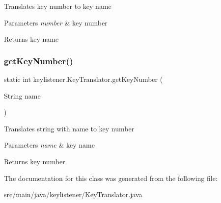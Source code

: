Translates key number to key name 
\begin{DoxyParams}{Parameters}
{\em number} & key number \\
\hline
\end{DoxyParams}
\begin{DoxyReturn}{Returns}
key name 
\end{DoxyReturn}
\mbox{\label{classkeylistener_1_1_key_translator_abd2332b9ec51409f5ef9fe9d0e593f96}} 
\subsubsection{\texorpdfstring{get\+Key\+Number()}{getKeyNumber()}}
{\footnotesize\ttfamily static int keylistener.\+Key\+Translator.\+get\+Key\+Number (\begin{DoxyParamCaption}\item[{String}]{name }\end{DoxyParamCaption})\hspace{0.3cm}{\ttfamily [static]}}

Translates string with name to key number 
\begin{DoxyParams}{Parameters}
{\em name} & key name \\
\hline
\end{DoxyParams}
\begin{DoxyReturn}{Returns}
key number 
\end{DoxyReturn}


The documentation for this class was generated from the following file\+:\begin{DoxyCompactItemize}
\item 
src/main/java/keylistener/Key\+Translator.\+java\end{DoxyCompactItemize}
